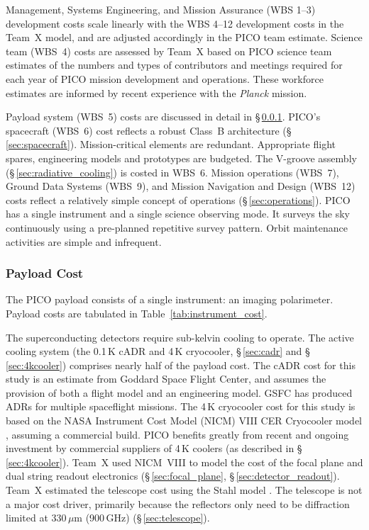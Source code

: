 Management, Systems Engineering, and Mission Assurance (WBS 1--3)
development costs scale linearly with the WBS 4--12 development costs
in the Team~X model, and are adjusted accordingly in the PICO team
estimate. Science team (WBS~4) costs are assessed by Team~X based on PICO
science team estimates of the numbers and types of contributors and
meetings required for each year of PICO mission development and
operations. These workforce estimates are informed by recent
experience with the \textit{Planck} mission.

Payload system (WBS~5) costs are discussed in detail in
\S\,\ref{sec:instrument_cost}.  PICO's spacecraft (WBS~6) cost
reflects a robust Class~B architecture
(\S\,\ref{sec:spacecraft}). Mission-critical elements are
redundant. Appropriate flight spares, engineering models and
prototypes are budgeted. The V-groove assembly (\S\,\ref{sec:radiative_cooling})
is costed in WBS~6.  Mission operations (WBS~7), Ground Data Systems
(WBS~9), and Mission Navigation and Design (WBS~12) costs reflect a
relatively simple concept of operations (\S\,\ref{sec:operations}). PICO has a single
instrument and a single science observing mode. It surveys the sky
continuously using a pre-planned repetitive survey pattern. Orbit
maintenance activities are simple and infrequent.

\subsubsection{Payload Cost}
\label{sec:instrument_cost} %



The PICO payload consists of a single instrument: an imaging
polarimeter. Payload costs are tabulated in
Table~\ref{tab:instrument_cost}.

The superconducting detectors require sub-kelvin cooling to
operate. The active cooling system (the 0.1\,K cADR and 4\,K
cryocooler, \S\,\ref{sec:cadr} and \S\,\ref{sec:4kcooler}) comprises nearly half of the payload
cost. The cADR cost for this study is an estimate from Goddard
Space Flight Center, and assumes the provision of both a flight
model and an engineering model. GSFC has produced ADRs for multiple
spaceflight missions. The 4\,K cryocooler cost for this study is based
on the NASA Instrument Cost Model (NICM) VIII CER Cryocooler model
\cite{Mrozinski2017}, assuming a commercial build. PICO benefits
greatly from recent and ongoing investment by commercial suppliers of
4\,K coolers (as described in \S\,\ref{sec:4kcooler}).  Team~X used NICM~VIII to model
the cost of the focal plane and dual string readout electronics (\S\,\ref{sec:focal_plane},
\S\,\ref{sec:detector_readout}).  Team~X estimated the telescope cost using the Stahl model
\cite{Stahl2016}. The telescope is not a major cost driver, primarily
because the reflectors only need to be diffraction limited at 330\,$\mu$m
(900\,GHz) (\S\,\ref{sec:telescope}).


